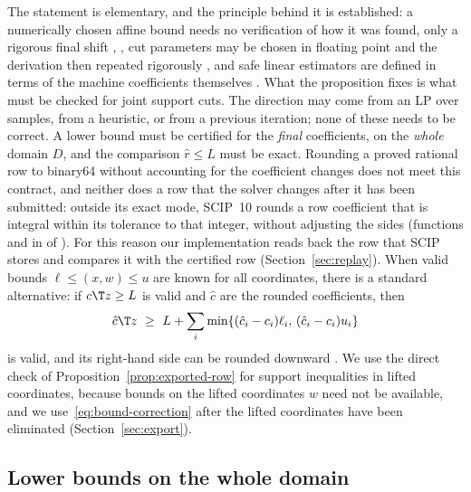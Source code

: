 The statement is elementary, and the principle behind it is
established: a numerically chosen affine bound needs no verification of
how it was found, only a rigorous final shift
\citep[Section~5]{GarloffJanssonSmith2003JCAM}, \citep{GarloffSmith2008},
cut parameters may be chosen in floating point and the derivation then
repeated rigorously \citep[p.~294]{NeumaierShcherbina2004}, and safe
linear estimators are defined in terms of the machine coefficients
themselves \citep{BorradaileVanHentenryck2005}. What the proposition fixes
is what must be checked for joint support cuts. The direction may come
from an LP over samples, from a heuristic, or from a previous iteration;
none of these needs to be correct. A lower bound must be certified for the
\emph{final} coefficients, on the \emph{whole} domain $D$, and the
comparison $\hat r\le L$ must be exact. Rounding a proved rational row to
binary64 without accounting for the coefficient changes does not meet
this contract, and neither does a row that the solver changes after it
has been submitted: outside its exact mode, SCIP~10 rounds a row coefficient that is integral
within its tolerance to that integer, without adjusting the sides
(functions  and  in
 of \citealp{SCIPsource10}). For this reason our implementation reads back
the row that SCIP stores and compares it with the certified row
(Section~\ref{sec:replay}). When valid bounds $\ell\le(x,w)\le u$ are known
for all coordinates, there is a standard alternative: if $c\T z\ge L$ is
valid and $\hat c$ are the rounded coefficients, then
\begin{equation}\label{eq:bound-correction}
\hat c\T z\ \ge\ L+\sum_i\min\{(\hat c_i-c_i)\ell_i,\,(\hat c_i-c_i)u_i\}
\end{equation}
is valid, and its right-hand side can be rounded downward
\citep{NeumaierShcherbina2004,EiflerGleixner2024}. We use the direct
check of Proposition~\ref{prop:exported-row} for support inequalities
in lifted coordinates, because bounds on the lifted coordinates $w$
need not be available, and we use~\eqref{eq:bound-correction} after the
lifted coordinates have been eliminated (Section~\ref{sec:export}).

\subsection{Lower bounds on the whole domain}\label{sec:bounds}

